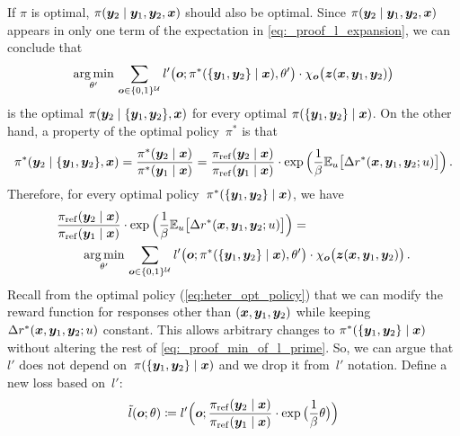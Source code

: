\begin{proofEnd}
\begin{proofEnd}
        If $\pi$ is optimal, $\pi({\bm{y}}_2 \mid {{\bm{y}}_1, {\bm{y}}_2}, {\bm{x}})$ should also be optimal. Since $\pi({\bm{y}}_2 \mid {{\bm{y}}_1, {\bm{y}}_2}, {\bm{x}})$ appears in only one term of the expectation in \cref{eq:_proof_l_expansion}, we can conclude that
        \begin{equation*}
            \operatorname*{arg\,min}_{\theta'} \, \sum_{{\bm{o}} \in \{0, 1\}^{{\mathcal{U}}}}
            l'\big({\bm{o}}; \pi^*(\{{\bm{y}}_1, {\bm{y}}_2\} \mid {\bm{x}}), \theta'\big) \cdot
            \chi_{\bm{o}}\big({\bm{z}}({\bm{x}}, {\bm{y}}_1, {\bm{y}}_2)\big)
        \end{equation*}
        is the optimal $\pi({\bm{y}}_2 \mid \{{\bm{y}}_1, {\bm{y}}_2\}, {\bm{x}})$ for every optimal $\pi(\{{\bm{y}}_1, {\bm{y}}_2\} \mid {\bm{x}})$.  
        On the other hand, a property of the optimal policy~$\pi^*$ is that 
        \begin{equation*}
            \pi^*({\bm{y}}_2 \mid \{{\bm{y}}_1, {\bm{y}}_2\}, {\bm{x}}) = \frac{\pi^*({\bm{y}}_2 \mid {\bm{x}})}{\pi^*({\bm{y}}_1 \mid {\bm{x}})} = \frac{\pi_{\rm ref}({\bm{y}}_2 \mid {\bm{x}})}{\pi_{\rm ref}({\bm{y}}_1 \mid {\bm{x}})} \cdot \exp\Big(\frac{1}{\beta}\mathbb{E}_u\big[\Delta r^*({\bm{x}}, {\bm{y}}_1, {\bm{y}}_2; u)\big]\Big)
            \,.
        \end{equation*}
        Therefore, for every optimal policy~$\pi^*(\{{\bm{y}}_1, {\bm{y}}_2\} \mid {\bm{x}})$, we have 
        \begin{equation}
        \begin{aligned}
        \label{eq:_proof_min_of_l_prime}
            &\frac{\pi_{\rm ref}({\bm{y}}_2 \mid {\bm{x}})}{\pi_{\rm ref}({\bm{y}}_1 \mid {\bm{x}})} \cdot \exp\Big(\frac{1}{\beta}\mathbb{E}_u\big[\Delta r^*({\bm{x}}, {\bm{y}}_1, {\bm{y}}_2; u)\big]\Big) = \\
            &\quad\quad\operatorname*{arg\,min}_{\theta'} \, 
            \sum_{{\bm{o}} \in \{0, 1\}^{{\mathcal{U}}}} l'\big({\bm{o}}; \pi^*(\{{\bm{y}}_1, {\bm{y}}_2\} \mid {\bm{x}}), \theta'\big) \cdot \chi_{\bm{o}}\big({\bm{z}}({\bm{x}}, {\bm{y}}_1, {\bm{y}}_2)\big)
            \,.
        \end{aligned}
        \end{equation}
        Recall from the optimal policy (\cref{eq:heter_opt_policy}) that we can modify the reward function for responses other than $({\bm{x}}, {\bm{y}}_1, {\bm{y}}_2)$ while keeping $\Delta r^*({\bm{x}}, {\bm{y}}_1, {\bm{y}}_2; u)$ constant. This allows arbitrary changes to $\pi^*(\{{\bm{y}}_1, {\bm{y}}_2\} \mid {\bm{x}})$ without altering the rest of \cref{eq:_proof_min_of_l_prime}. So, we can argue that $l'$ does not depend on~$\pi(\{{\bm{y}}_1, {\bm{y}}_2\} \mid {\bm{x}})$ and we drop it from~$l'$ notation. Define a new loss based on~$l'$:
        \begin{equation*}
            \till(\vo; \theta)  \coloneqq l'\Big(\vo; \frac{\pi_\reff(\vy_2 \mid \vx)}{\pi_\reff(\vy_1 \mid \vx)} \cdot \exp\big(\frac{1}{\beta}\theta\big)\Big)

\end{equation*}
\end{proofEnd}
\end{proofEnd}
